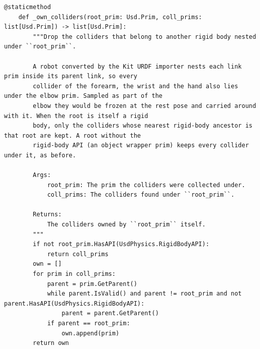 \begin{snippetbox}[14]
\begin{lstlisting}[firstnumber=136]
    @staticmethod
    def _own_colliders(root_prim: Usd.Prim, coll_prims: list[Usd.Prim]) -> list[Usd.Prim]:
        """Drop the colliders that belong to another rigid body nested under ``root_prim``.

        A robot converted by the Kit URDF importer nests each link prim inside its parent link, so every
        collider of the forearm, the wrist and the hand also lies under the elbow prim. Sampled as part of the
        elbow they would be frozen at the rest pose and carried around with it. When the root is itself a rigid
        body, only the colliders whose nearest rigid-body ancestor is that root are kept. A root without the
        rigid-body API (an object wrapper prim) keeps every collider under it, as before.

        Args:
            root_prim: The prim the colliders were collected under.
            coll_prims: The colliders found under ``root_prim``.

        Returns:
            The colliders owned by ``root_prim`` itself.
        """
        if not root_prim.HasAPI(UsdPhysics.RigidBodyAPI):
            return coll_prims
        own = []
        for prim in coll_prims:
            parent = prim.GetParent()
            while parent.IsValid() and parent != root_prim and not parent.HasAPI(UsdPhysics.RigidBodyAPI):
                parent = parent.GetParent()
            if parent == root_prim:
                own.append(prim)
        return own
\end{lstlisting}
\end{snippetbox}
